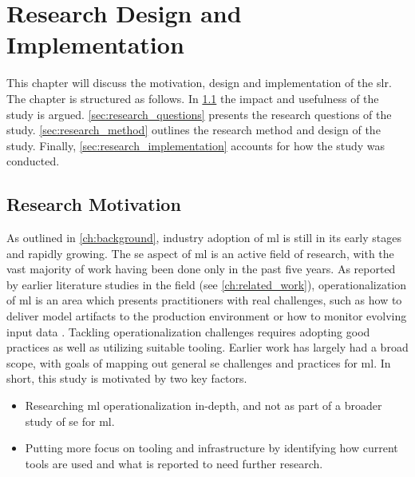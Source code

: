 \chapter{Research Design and Implementation}
\label{ch:research_design_and_implementation}
This chapter will discuss the motivation, design and implementation of the \acrshort{slr}.
The chapter is structured as follows.
In \cref{sec:research_motivation} the impact and usefulness of the study is argued.
\cref{sec:research_questions} presents the research questions of the study.
\cref{sec:research_method} outlines the research method and design of the study.
Finally, \cref{sec:research_implementation} accounts for how the study was conducted.

\section{Research Motivation}
\label{sec:research_motivation}
As outlined in \cref{ch:background}, industry adoption of \acrshort{ml} is still in its early stages and rapidly growing.
The \acrshort{se} aspect of \acrshort{ml} is an active field of research, with the vast majority of work having been done only in the past five years.
As reported by earlier literature studies in the field (see \cref{ch:related_work}), operationalization of \acrshort{ml} is an area which presents practitioners with real challenges, such as how to deliver model artifacts to the production environment or how to monitor evolving input data \cite{Paleyes2020}.
Tackling operationalization challenges requires adopting good practices as well as utilizing suitable tooling.
Earlier work has largely had a broad scope, with goals of mapping out general \acrshort{se} challenges and practices for \acrshort{ml}.
In short, this study is motivated by two key factors.
\begin{itemize}
    \item Researching \acrshort{ml} operationalization in-depth, and not as part of a broader study of \acrshort{se} for \acrshort{ml}.
    \item Putting more focus on tooling and infrastructure by identifying how current tools are used and what is reported to need further research.
\end{itemize}

